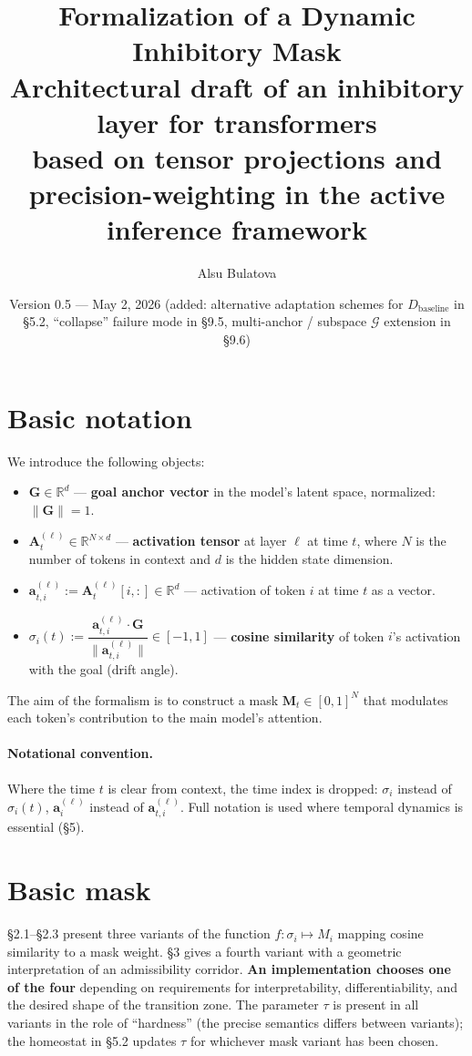 \documentclass[12pt,a4paper]{article}
\title{\textbf{Formalization of a Dynamic Inhibitory Mask}\\
\large Architectural draft of an inhibitory layer for transformers\\
based on tensor projections and precision-weighting in the active inference framework}
\author{Alsu Bulatova}
\date{Version 0.5 --- May 2, 2026 (added: alternative adaptation schemes for $D_{\text{baseline}}$ in \S5.2, ``collapse'' failure mode in \S9.5, multi-anchor / subspace $\mathcal{G}$ extension in \S9.6)}
\begin{document}
\maketitle

\section{Basic notation}

We introduce the following objects:

\begin{itemize}
    \item $\mathbf{G} \in \mathbb{R}^d$ --- \textbf{goal anchor vector} in the model's latent space, normalized: $\|\mathbf{G}\| = 1$.
    \item $\mathbf{A}_t^{(\ell)} \in \mathbb{R}^{N \times d}$ --- \textbf{activation tensor} at layer $\ell$ at time $t$, where $N$ is the number of tokens in context and $d$ is the hidden state dimension.
    \item $\mathbf{a}_{t,i}^{(\ell)} := \mathbf{A}_t^{(\ell)}[i, :] \in \mathbb{R}^d$ --- activation of token $i$ at time $t$ as a vector.
    \item $\sigma_i(t) := \dfrac{\mathbf{a}_{t,i}^{(\ell)} \cdot \mathbf{G}}{\|\mathbf{a}_{t,i}^{(\ell)}\|} \in [-1, 1]$ --- \textbf{cosine similarity} of token $i$'s activation with the goal (drift angle).
\end{itemize}

The aim of the formalism is to construct a mask $\mathbf{M}_t \in [0, 1]^N$ that modulates each token's contribution to the main model's attention.

\paragraph{Notational convention.} Where the time $t$ is clear from context, the time index is dropped: $\sigma_i$ instead of $\sigma_i(t)$, $\mathbf{a}_i^{(\ell)}$ instead of $\mathbf{a}_{t,i}^{(\ell)}$. Full notation is used where temporal dynamics is essential (\S5).

\section{Basic mask}

\S2.1--\S2.3 present three variants of the function $f: \sigma_i \mapsto M_i$ mapping cosine similarity to a mask weight. \S3 gives a fourth variant with a geometric interpretation of an admissibility corridor. \textbf{An implementation chooses one of the four} depending on requirements for interpretability, differentiability, and the desired shape of the transition zone. The parameter $\tau$ is present in all variants in the role of ``hardness'' (the precise semantics differs between variants); the homeostat in \S5.2 updates $\tau$ for whichever mask variant has been chosen.
\end{document}
